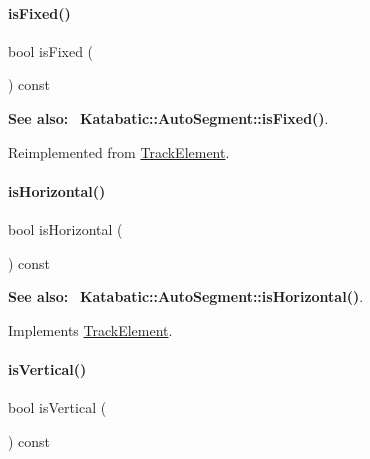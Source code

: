 \paragraph{\texorpdfstring{is\+Fixed()}{isFixed()}}
{\footnotesize\ttfamily bool is\+Fixed (\begin{DoxyParamCaption}{ }\end{DoxyParamCaption}) const\hspace{0.3cm}{\ttfamily [virtual]}}

{\bfseries See also\+:}~ \textbf{ Katabatic\+::\+Auto\+Segment\+::is\+Fixed()}. 

Reimplemented from \hyperlink{classKite_1_1TrackElement_afd7362b850709bed8b61c1aa22399f97}{Track\+Element}.

\mbox{\label{classKite_1_1TrackSegment_a21b9cefd33ae22e4c2070ad441bdd30b}} 
\paragraph{\texorpdfstring{is\+Horizontal()}{isHorizontal()}}
{\footnotesize\ttfamily bool is\+Horizontal (\begin{DoxyParamCaption}{ }\end{DoxyParamCaption}) const\hspace{0.3cm}{\ttfamily [virtual]}}

{\bfseries See also\+:}~ \textbf{ Katabatic\+::\+Auto\+Segment\+::is\+Horizontal()}. 

Implements \hyperlink{classKite_1_1TrackElement_a9d3db1f8a5aca58f8f54d291faebf873}{Track\+Element}.

\mbox{\label{classKite_1_1TrackSegment_abd54544ef1710ee4b67cfb021d73446c}} 
\paragraph{\texorpdfstring{is\+Vertical()}{isVertical()}}
{\footnotesize\ttfamily bool is\+Vertical (\begin{DoxyParamCaption}{ }\end{DoxyParamCaption}) const\hspace{0.3cm}{\ttfamily [virtual]}}

